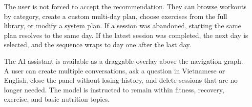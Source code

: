 The user is not forced to accept the recommendation. They can browse workouts by category, create a custom multi-day plan, choose exercises from the full library, or modify a system plan. If a session was abandoned, starting the same plan resolves to the same day. If the latest session was completed, the next day is selected, and the sequence wraps to day one after the last day.

The AI assistant is available as a draggable overlay above the navigation graph. A user can create multiple conversations, ask a question in Vietnamese or English, close the panel without losing history, and delete sessions that are no longer needed. The model is instructed to remain within fitness, recovery, exercise, and basic nutrition topics.
